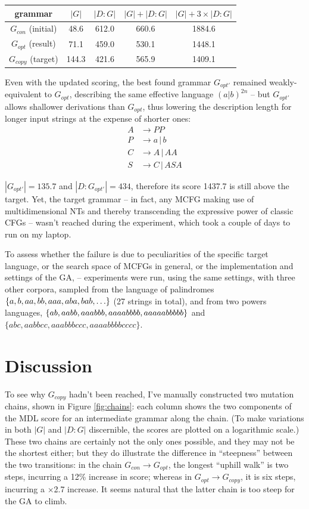 \documentclass{article}
\begin{document}
\begin{table}[h]
\begin{tabular}{ c | c c c c }
 grammar & $|G|$ & $|D:G|$ & $|G| + |D:G|$ & $|G| + 3\times|D:G|$ \\ 
 \hline
 $G_{con}$ (initial) & 48.6 & 612.0 & 660.6 & 1884.6 \\
 $G_{opt}$ (result) & 71.1 & 459.0 & 530.1 & 1448.1 \\  
 $G_{copy}$ (target) & 144.3 & 421.6 & 565.9 & 1409.1
\end{tabular}
\end{table}

Even with the updated scoring, the best found grammar $G_{opt'}$ remained weakly-equivalent to $G_{opt}$,
describing the same effective language $(a|b)^{2n}$ -- but $G_{opt'}$ allows shallower derivations
than $G_{opt}$, thus lowering the description length for longer input strings at the expense of shorter ones:
\begin{align*}
A &\rightarrow PP\\
P &\rightarrow a\,|\,b\\
C &\rightarrow A\,|\,AA\\
S &\rightarrow C\,|\,ASA
\end{align*}

$|G_{opt'}|=135.7$ and $|D:G_{opt'}|=434$, therefore its score 1437.7 is still above the target.
Yet, the target grammar --
in fact, any MCFG making use of multidimensional NTs and thereby transcending the expressive power
of classic CFGs -- wasn't reached during the experiment, which took a couple of days to run on my laptop.

To assess whether the failure is due to peculiarities of the specific target language,
or the search space of MCFGs in general, or the implementation and settings of the GA, --
experiments were run, using the same settings, with three other corpora,
sampled from the language of palindromes $\{a, b, aa, bb, aaa, aba,\\ bab, \ldots\}$
(27 strings in total),
and from two powers languages, $\{ab, aabb, aaabbb,\\ aaaabbbb, aaaaabbbbb\}$ and
$\{abc, aabbcc, aaabbbccc, aaaabbbbcccc\}$.


\section{Discussion}

To see why $G_{copy}$ hadn't been reached, I've manually constructed two mutation chains,
shown in Figure \ref{fig:chains}: each column shows the two components of the MDL score
for an intermediate grammar along the chain.
(To make variations in both $|G|$ and $|D:G|$ discernible, the scores are plotted on a logarithmic scale.)
These two chains are certainly not the only ones possible, and they may not be the shortest either;
but they do illustrate the difference in ``steepness'' between the two transitions:
in the chain $G_{con} \rightarrow G_{opt}$, the longest ``uphill walk'' is two steps, incurring a 12\% increase in score;
whereas in $G_{opt} \rightarrow G_{copy}$, it is six steps, incurring a $\times$2.7 increase.
It seems natural that the latter chain is too steep for the GA to climb.
\end{document}
